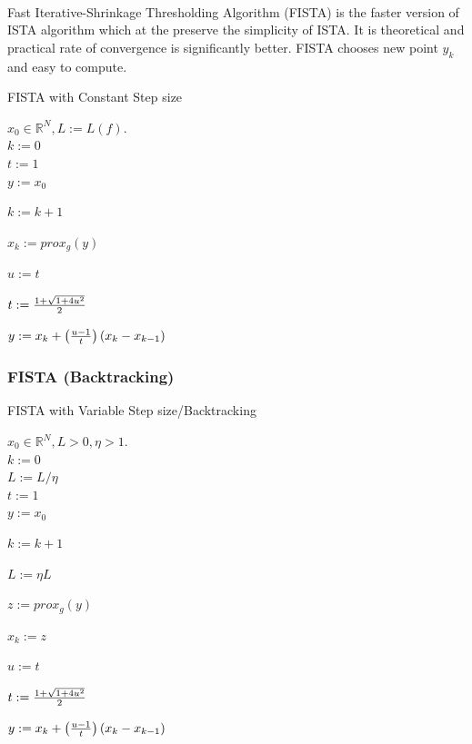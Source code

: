 \paragraph{}Fast Iterative-Shrinkage Thresholding Algorithm (FISTA) is the faster 
version of ISTA algorithm which at the preserve the simplicity of ISTA. It is theoretical
 and practical rate of convergence is significantly better. FISTA chooses new point $y_k$
and easy to compute.

\vspace{1.3mm}
\begin{algorithm}
  \caption{FISTA with Constant Step size} \label{fista_c}
  \begin{algorithmic}
   \Require $x_0 \in \mathbb{R}^N, L := L(f)$.\\
   $k := 0$\\
   $t := 1$\\
   $y := x_0$
   \Repeat

    $k := k + 1$

    $x_{k} := prox_g( y )$

    $u := t$

    $t := { 1 + \sqrt{1 + 4 u^2} \over 2 }$

    $y := x_k + \left( {u - 1 \over t} \right) ( x_k - x_{k-1} )$
  \end{algorithmic}
 \end{algorithm}
\vspace{1.3mm}
\subsubsection{ FISTA (Backtracking) }
\vspace{1.3mm}
\begin{algorithm}
  \caption{FISTA with Variable Step size/Backtracking} \label{fista_b}
  \begin{algorithmic}
   \Require $x_0 \in \mathbb{R}^N, L > 0, \eta > 1$.\\
   $k := 0$\\
   $L := L / \eta$\\
   $t := 1$\\
   $y := x_0$
   \Repeat

    $k := k + 1$

    \Repeat

     $L := \eta L$

     $z := prox_g( y )$


    $x_{k} := z$

    $u := t$

    $t := { 1 + \sqrt{1 + 4 u^2} \over 2 }$

    $y := x_k + \left( {u - 1 \over t} \right) ( x_k - x_{k-1} )$
  \end{algorithmic}
 \end{algorithm}
\vspace{1.3mm}

